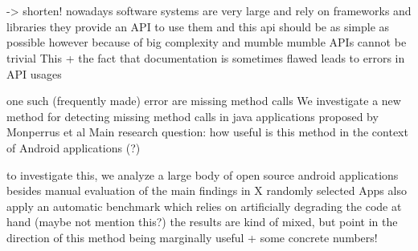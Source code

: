 \chapter{\abstractname}


-> shorten!
nowadays software systems are very large and rely on frameworks and libraries
they provide an API to use them and this api should be as simple as possible
however because of big complexity and mumble mumble APIs cannot be trivial
This + the fact that documentation is sometimes flawed leads to errors in API usages

one such (frequently made) error are missing method calls
We investigate a new method for detecting missing method calls in java applications proposed by Monperrus et al
Main research question: how useful is this method in the context of Android applications (?)

to investigate this, we analyze a large body of open source android applications
besides manual evaluation of the main findings in X randomly selected Apps
also apply an automatic benchmark which relies on artificially degrading the code at hand (maybe not mention this?)
the results are kind of mixed, but point in the direction of this method being marginally useful
+ some concrete numbers!
